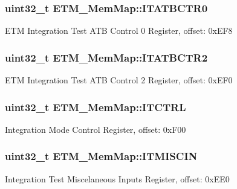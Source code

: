 \subsubsection[{I\+T\+A\+T\+B\+C\+T\+R0}]{\setlength{\rightskip}{0pt plus 5cm}uint32\+\_\+t E\+T\+M\+\_\+\+Mem\+Map\+::\+I\+T\+A\+T\+B\+C\+T\+R0}\label{struct_e_t_m___mem_map_aa5fdf34d92821f87bbcde2dbb43a6d3c}
E\+T\+M Integration Test A\+T\+B Control 0 Register, offset\+: 0x\+E\+F8 \hypertarget{struct_e_t_m___mem_map_ac2904f8a9c14b9bc63b82fddb4595962}{}
\subsubsection[{I\+T\+A\+T\+B\+C\+T\+R2}]{\setlength{\rightskip}{0pt plus 5cm}uint32\+\_\+t E\+T\+M\+\_\+\+Mem\+Map\+::\+I\+T\+A\+T\+B\+C\+T\+R2}\label{struct_e_t_m___mem_map_ac2904f8a9c14b9bc63b82fddb4595962}
E\+T\+M Integration Test A\+T\+B Control 2 Register, offset\+: 0x\+E\+F0 \hypertarget{struct_e_t_m___mem_map_a01935d66d22a870449dfbcae7f735fd8}{}
\subsubsection[{I\+T\+C\+T\+R\+L}]{\setlength{\rightskip}{0pt plus 5cm}uint32\+\_\+t E\+T\+M\+\_\+\+Mem\+Map\+::\+I\+T\+C\+T\+R\+L}\label{struct_e_t_m___mem_map_a01935d66d22a870449dfbcae7f735fd8}
Integration Mode Control Register, offset\+: 0x\+F00 \hypertarget{struct_e_t_m___mem_map_ab0288cb0941aa3a494bc261eef1144f7}{}
\subsubsection[{I\+T\+M\+I\+S\+C\+I\+N}]{\setlength{\rightskip}{0pt plus 5cm}uint32\+\_\+t E\+T\+M\+\_\+\+Mem\+Map\+::\+I\+T\+M\+I\+S\+C\+I\+N}\label{struct_e_t_m___mem_map_ab0288cb0941aa3a494bc261eef1144f7}
Integration Test Miscelaneous Inputs Register, offset\+: 0x\+E\+E0 \hypertarget{struct_e_t_m___mem_map_a85a29fa5f53cb199fd980f61593d4c45}{}
